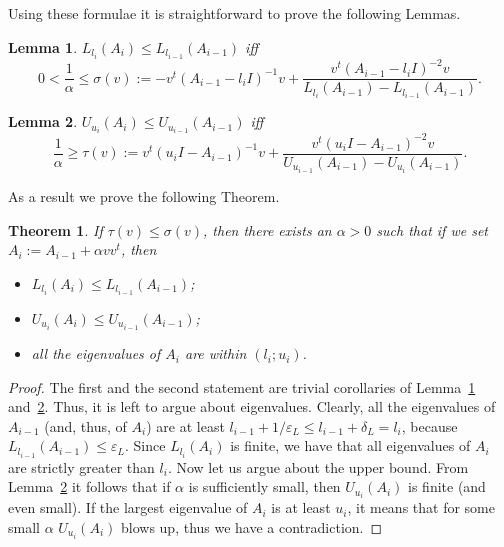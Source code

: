 \documentclass[12pt]{article}
\newcommand{\eps}{\varepsilon}
\newtheorem{theorem}{Theorem}
\newtheorem{lemma}{Lemma}
\begin{document}
    Using these formulae it is straightforward to prove the following Lemmas.

    \begin{lemma}
        \label{lower_shift}
        $L_{l_i}(A_i) \leq L_{l_{i-1}}(A_{i-1})$ iff
        $$
            0 < \frac{1}{\alpha} \leq \sigma(v) := -v^t(A_{i-1}-l_iI)^{-1}v +
            \frac{v^t(A_{i-1}-l_iI)^{-2}v}{L_{l_i}(A_{i-1}) - L_{l_{i-1}}(A_{i-1})}.
        $$
    \end{lemma}

    \begin{lemma}
        \label{upper_shift}
        $U_{u_i}(A_i) \leq U_{u_{i-1}}(A_{i-1})$ iff
        $$
            \frac{1}{\alpha} \geq \tau(v) := v^t(u_iI - A_{i-1})^{-1}v +
            \frac{v^t(u_iI - A_{i-1})^{-2}v}{U_{u_{i-1}}(A_{i-1}) - U_{u_i}(A_{i-1})}.
        $$
    \end{lemma}

    As a result we prove the following Theorem.
    \begin{theorem}
        If $\tau(v) \leq \sigma(v)$, then there exists an $\alpha > 0$ such that if we set $A_i := A_{i-1} + \alpha vv^t$,
        then
        \begin{itemize}
            \item $L_{l_i}(A_i) \leq L_{l_{i-1}}(A_{i-1})$;
            \item $U_{u_i}(A_i) \leq U_{u_{i-1}}(A_{i-1})$;
            \item all the eigenvalues of $A_i$ are within $(l_i; u_i)$.
        \end{itemize}
    \end{theorem}
    \begin{proof}
        The first and the second statement are trivial corollaries of Lemma~\ref{lower_shift} and~\ref{upper_shift}.
        Thus, it is left to argue about eigenvalues.
        Clearly, all the eigenvalues of $A_{i-1}$ (and, thus, of $A_i$) are at least
        $l_{i-1} + 1 / \eps_L \leq l_{i-1} + \delta_L = l_i$, because $L_{l_{i-1}}(A_{i-1}) \leq \eps_L$.
        Since $L_{l_i}(A_i)$ is finite, we have that all eigenvalues of $A_i$ are strictly greater than $l_i$.
        Now let us argue about the upper bound. From Lemma~\ref{upper_shift} it follows that if $\alpha$ is sufficiently
        small, then $U_{u_i}(A_i)$ is finite (and even small). If the largest eigenvalue of $A_i$ is at least $u_i$,
        it means that for some small $\alpha$ $U_{u_i}(A_i)$ blows up, thus we have a contradiction.
    \end{proof}
\end{document}
